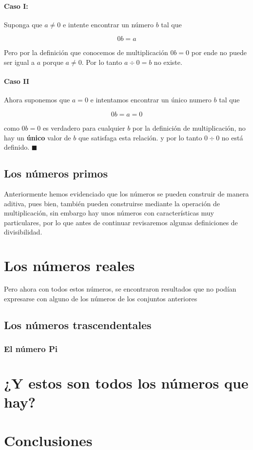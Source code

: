 \documentclass{article}
\begin{document}
\paragraph{Caso I:} Suponga que $a \neq 0$ e intente encontrar un número $b$ tal que

$$0b = a$$

Pero por la definición que conocemos de multiplicación $0b = 0$ por ende no puede ser igual a $a$ porque $a \neq 0$. Por lo tanto $a \div 0 = b$ no existe.

\paragraph{Caso II} Ahora suponemos que $a = 0$ e intentamos encontrar un único numero $b$ tal que 

$$0b = a = 0$$

como $0b = 0$ es verdadero para cualquier $b$ por la definición de multiplicación, no hay un \textbf{único} valor de $b$ que satisfaga esta relación. y por lo tanto $0 \div 0$ no está definido. $\blacksquare$

\subsection{Los números primos} Anteriormente hemos evidenciado que los números se pueden construir de manera aditiva, pues bien, también pueden construirse mediante la operación de multiplicación, sin embargo hay unos números con características muy particulares, por lo que antes de continuar revisaremos algunas definiciones de divisibilidad.

\section{Los números reales}

Pero ahora con todos estos números, se encontraron resultados que no podían expresarse con alguno de los números de los conjuntos anteriores

\subsection{Los números trascendentales}

\subsubsection{El número Pi}

\section{¿Y estos son todos los números que hay?}

\section{Conclusiones}

\newpage

\nocite{*}


\end{document}
